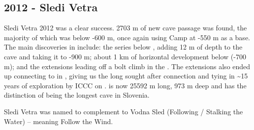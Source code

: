 \begin{tcolorbox}
\chapter{2012 - Sledi Vetra}

Sledi Vetra 2012 was a clear success. 2703 m of new cave passage was
found, the majority of which was below -600 m, once again using Camp
 at -550 m as a base. The main discoveries in
 include: the  series below
, adding 12 m of depth to the cave and taking it to -900 m;
about 1 km of horizontal development below 
(-700 m); and the  extensions leading off a bolt climb in
the . The  extensions also ended
up connecting to  in , giving us the long
sought after connection and tying in \textasciitilde 15 years of
exploration by ICCC on .  is now 25592 m long, 973
m deep and has the distinction of being the longest cave in Slovenia.

Sledi Vetra was named to complement to Vodna Sled (Following / Stalking the Water) -- meaning Follow the Wind.

\end{tcolorbox}
\BgThispage









